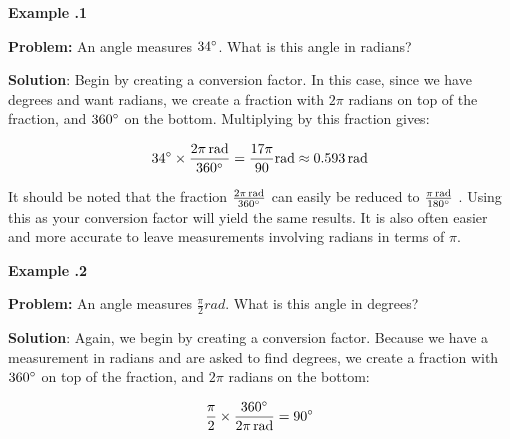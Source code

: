  \begin{mdframed}[backgroundcolor=blue!10!white]
	\begin{center}	
		\textbf{Example \thesection.1}	
	\end{center}
	
	\textbf{Problem:} An angle measures $34 \degree$.  What is this angle in radians? 
	
	\vspace{0.2 in} 
	\textbf{Solution}: Begin by creating a conversion factor.  In this case, since we have degrees and want radians, we create a fraction with $2\pi$ radians on top of the fraction, and $360\degree$ on the bottom.  Multiplying by this fraction gives:
	
\begin{equation*}
	34 \degree \times \frac{2 \pi \, \si{rad}}{360 \degree} = \frac{17 \pi}{90}\si{rad} \approx 0.593 \, \si{rad}  
\end{equation*}
	
	It should be noted that the fraction $\frac{2 \pi \, \si{rad}}{360 \degree}$ can easily be reduced to $\frac{ \pi \, \si{rad}}{180 \degree}$ .  Using this as your conversion factor will yield the same results.  It is also often easier and more accurate to leave measurements involving radians in terms of $\pi$.  
	
\end{mdframed}
   
   
    \begin{mdframed}[backgroundcolor=blue!10!white]
   	\begin{center}	
   		\textbf{Example \thesection.2}	
   	\end{center}
   	
   	\textbf{Problem:} An angle measures $\frac{\pi}{2} \si{rad}$.  What is this angle in degrees? 
   	
   	\vspace{0.2 in} 
   	\textbf{Solution}: Again, we begin by creating a conversion factor.  Because we have a measurement in radians and are asked to find degrees, we create a fraction with $360\degree$ on top of the fraction, and  $2\pi$ radians on the bottom:
   	
   	\begin{equation*}
   		\frac{\pi}{2}  \times \frac{360 \degree}{2 \pi \, \si{rad}} = 90 \degree
   	\end{equation*}
 
   	
   \end{mdframed}

